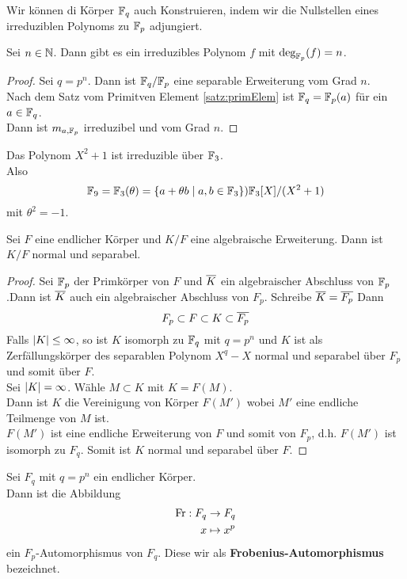 	\begin{bem}
		Wir können di Körper $\mathbb{F}_q$ auch Konstruieren, indem wir die Nullstellen eines irreduziblen Polynoms zu $\mathbb{F}_p$ adjungiert.
	\end{bem}

	\begin{satz}
		Sei $n\in\mathbb{N}$. Dann gibt es ein irreduzibles Polynom $f$ mit $\deg_{\mathbb{F}_p}(f)=n$.
	\end{satz}
	\begin{proof}
		Sei $q=p^n$. Dann ist $\mathbb{F}_q/\mathbb{F}_p$ eine separable Erweiterung vom Grad $n$.\\
		Nach dem Satz vom Primitven Element \ref{satz:primElem} ist $\mathbb{F}_q=\mathbb{F}_p(a)$ für ein $a\in\mathbb{F}_q$.\\
		Dann ist $m_{a,\mathbb{F}_p}$ irreduzibel und vom Grad $n$.
	\end{proof}

	\begin{exm}
		Das Polynom $X^2+1$ ist irreduzible über $\mathbb{F}_3$.\\
		Also
		\[\mathbb{F}_9=\mathbb{F}_3(\theta)=\{a+\theta b\mid a,b\in\mathbb{F}_3\})\mathbb{F}_3[X]/(X^2+1)\]
		mit $\theta^2=-1$.
	\end{exm}

	\begin{satz}
		Sei $F$ eine endlicher Körper und $K/F$ eine algebraische Erweiterung. Dann ist $K/F$ normal und separabel.
	\end{satz}
	\begin{proof}
		Sei $\mathbb{F}_p$ der Primkörper von $F$ und $\overline{K}$ ein algebraischer Abschluss von $\mathbb{F}_p$.Dann ist $\overline{K}$ auch ein algebraischer Abschluss von $F_p$. Schreibe $\overline{K}=\overline{F_p}$ Dann
		\[F_p\subset F\subset K\subset \overline{F_p}\]
		Falls $\left|K\right|\leq \infty$, so ist $K$ isomorph zu $\mathbb{F}_q$ mit $q=p^n$ und $K$ ist als Zerfällungskörper des separablen Polynom  $X^{q}-X$ normal und separabel über $F_p$ und somit über $F$.\\
		Sei $\left|K\right|=\infty$. Wähle $M\subset K$ mit $K=F(M)$.\\
		Dann ist $K$ die Vereinigung von Körper $F(M')$ wobei $M'$ eine endliche Teilmenge von $M$ ist.\\
		$F(M')$ ist eine endliche Erweiterung von $F$ und somit von $F_p$, d.h. $F(M')$ ist isomorph zu $F_q$. Somit ist $K$ normal und separabel über $F$.
	\end{proof}

	\begin{definition}
		Sei $F_q$ mit $q=p^n$ ein endlicher Körper.\\
		Dann ist die Abbildung
		\begin{align*}
		\operatorname{Fr}:F_q&\to F_q\\
		x&\mapsto x^p
		\end{align*}
		ein $F_p$-Automorphismus von $F_q$. Diese wir als \textbf{Frobenius-Automorphismus} bezeichnet.
	\end{definition}

